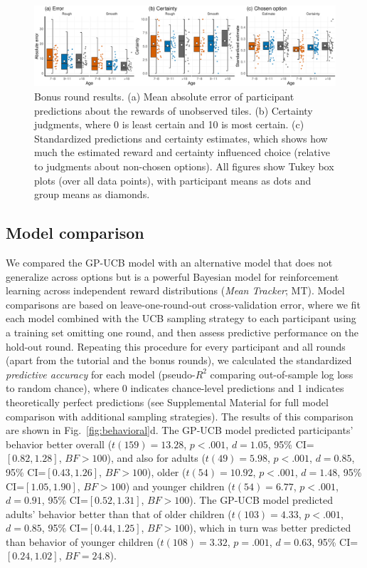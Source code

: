 \documentclass[a4paper,man, floatsintext, natbib]{apa6}
\begin{document}
\begin{figure}[t!]
\centering
\includegraphics[width=\linewidth]{judgements.pdf}
\caption{Bonus round results. (a) Mean absolute error of participant predictions about the rewards of unobserved tiles. (b) Certainty judgments, where 0 is least certain and 10 is most certain. (c) Standardized predictions and certainty estimates, which shows how much the estimated reward and certainty influenced choice (relative to judgments about non-chosen options). All figures show Tukey box plots (over all data points), with participant means as dots and group means as diamonds.}
\label{fig:judge} 
\end{figure}

\subsection{Model comparison}

We compared the GP-UCB model with an alternative model that does not generalize across options but is a powerful Bayesian model for reinforcement learning across independent reward distributions (\emph{Mean Tracker}; MT). Model comparisons are based on leave-one-round-out cross-validation error, where we fit each model combined with the UCB sampling strategy to each participant using a training set omitting one round, and then assess predictive performance on the hold-out round. Repeating this procedure for every participant and all rounds (apart from the tutorial and the bonus rounds), we calculated the standardized \emph{predictive accuracy} for each model (pseudo-$R^2$ comparing out-of-sample log loss to random chance), where 0 indicates chance-level predictions and 1 indicates theoretically perfect predictions (see Supplemental Material for full model comparison with additional sampling strategies). The results of this comparison are shown in Fig.~\ref{fig:behavioral}d. The GP-UCB model predicted participants' behavior better overall ($t(159)=13.28$, $p<.001$, $d=1.05$, 95\% CI=$[0.82, 1.28]$, $BF>100$), and also for adults ($t(49)=5.98$, $p<.001$, $d=0.85$, 95\% CI=$[0.43, 1.26]$, $BF>100$), older ($t(54)=10.92$, $p<.001$, $d=1.48$, 95\% CI=$[1.05, 1.90]$, $BF>100$) and younger children ($t(54)=6.77$, $p<.001$, $d=0.91$, 95\% CI=$[0.52, 1.31]$, $BF>100$). The GP-UCB model predicted adults' behavior better than that of older children ($t(103)=4.33$, $p<.001$, $d=0.85$, 95\% CI=$[0.44, 1.25]$, $BF>100$), which in turn was better predicted than behavior of younger children ($t(108)=3.32$, $p=.001$, $d=0.63$, 95\% CI=$[0.24, 1.02]$, $BF=24.8$).
\end{document}
